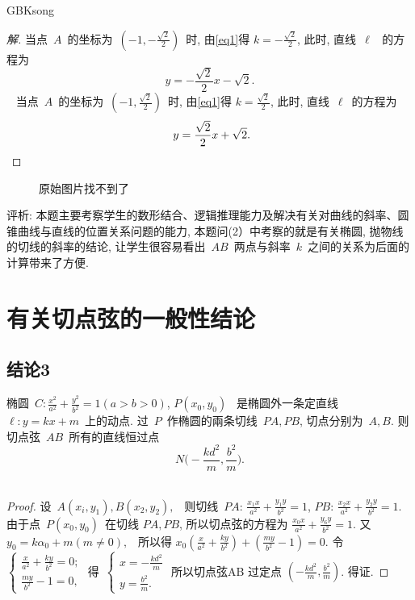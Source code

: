 \documentclass[a4paper, 12pt, twoside]{ctexart}
\begin{document}
\begin{CJK*}{GBK}{song}
\begin{proof}[解]
     当点~$A$~的坐标为~$(-1, -\frac{\sqrt{2}}{2})$~时, 由\eqref{eq1}得 $k=-\frac{\sqrt{2}}{2}$, 此时, 直线~$\ell$~ 的方程为
        $$~y=-\frac{\sqrt{2}}{2} x-\sqrt{2}.~$$~
    当点~$A$~的坐标为~$(-1,\frac{\sqrt{2}}{2})$~时,  由\eqref{eq1}得 $k=\frac{\sqrt{2}}{2}$, 此时, 直线~$\ell$~的方程为
        $$~y=\frac{\sqrt{2}}{2} x+\sqrt{2}.\vspace*{-24pt}$$
    \end{proof}
    \begin{figure}
    \centering
    \caption{原始图片找不到了}
    \end{figure}

\par 评析: 本题主要考察学生的数形结合、逻辑推理能力及解决有关对曲线的斜率、圆锥曲线与直线的位置关系问题的能力,  本题问(2）中考察的就是有关椭圆,  抛物线的切线的斜率的结论,  让学生很容易看出~$AB$~两点与斜率~$k$~之间的关系为后面的计算带来了方便.

\section{有关切点弦的一般性结论}
\subsection{结论3}
    \begin{propt}\label{propt7}
        椭圆~$C: \frac{x^2}{a^2}+\frac{y^2}{b^2}=1(a>b>0)$, $P(x_0, y_0)$~ 是椭圆外一条定直线~$\ell:  y=k x+m$~上的动点. 过~$P$~作椭圆的兩条切线~$PA,PB$, 切点分别为~$A,B$. 则切点弦~$AB$~所有的直线恒过点
            $$~N\Big(-\frac{k d^{2}}{m},  \frac{b^2}{m}\Big).~$$~
    \end{propt}
    \begin{proof}
        设~$A(x_i, y_1),  B(x_2,y_2), $~ 则切线~$PA:\,  \frac{x_1x}{a^2}+\frac{y_1y}{b^2}=1$, $PB:\,\frac{x_2 x}{a^2} +\frac{y_{2} y}{b^2}=1$. 由于点~$P(x_0, y_0)$~在切线 $PA,PB$, 所以切点弦的方程为 $\frac{x_0 x}{a^2}+\frac{y_{6} y}{b^2}=1$. 又~$y_0=k \alpha_{0}+m(m \neq 0), $~ 所以得 $x_0\left(\frac{x}{a^2}+\frac{k y}{b^2}\right)+\left(\frac{m y}{b^2}-1\right)=0$. 令
            $\begin{cases}\frac{x}{a^2}+\frac{k y}{b^2}=0;\\ \frac{m y}{b^2}-1=0,\end{cases}$ 得~$\begin{cases}x=-\frac{k d^{2}}{m} \\ y=\frac{b^2}{m}.\end{cases}$ 所以切点弦AB 过定点 $\left(-\frac{k d^{2}}{m},  \frac{b^2}{m}\right)$. 得证.
\end{proof}


\end{CJK*}
\end{document}
